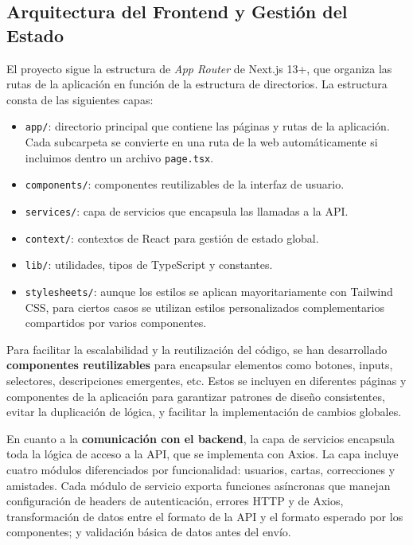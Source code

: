 \subsection{Arquitectura del Frontend y Gestión del Estado}

El proyecto sigue la estructura de \textit{App Router} de Next.js 13+, que organiza las rutas de la aplicación en función de la estructura de directorios. La estructura consta de las siguientes capas:

\begin{itemize}
    \item \texttt{app/}: directorio principal que contiene las páginas y rutas de la aplicación. Cada subcarpeta se convierte en una ruta de la web automáticamente si incluimos dentro un archivo \texttt{page.tsx}.
    \item \texttt{components/}: componentes reutilizables de la interfaz de usuario.
    \item \texttt{services/}: capa de servicios que encapsula las llamadas a la API.
    \item \texttt{context/}: contextos de React para gestión de estado global.
    \item \texttt{lib/}: utilidades, tipos de TypeScript y constantes.
    \item \texttt{stylesheets/}: aunque los estilos se aplican mayoritariamente con Tailwind CSS, para ciertos casos se utilizan estilos personalizados complementarios compartidos por varios componentes.
\end{itemize}


Para facilitar la escalabilidad y la reutilización del código, se han desarrollado \textbf{componentes reutilizables} para encapsular elementos como botones, inputs, selectores, descripciones emergentes, etc. Estos se incluyen en diferentes páginas y componentes de la aplicación para garantizar patrones de diseño consistentes, evitar la duplicación de lógica, y facilitar la implementación de cambios globales.

En cuanto a la \textbf{comunicación con el backend}, la capa de servicios encapsula toda la lógica de acceso a la API, que se implementa con Axios. La capa incluye cuatro módulos diferenciados por funcionalidad: usuarios, cartas, correcciones y amistades. Cada módulo de servicio exporta funciones asíncronas que manejan configuración de headers de autenticación, errores HTTP y de Axios, transformación de datos entre el formato de la API y el formato esperado por los componentes; y validación básica de datos antes del envío.

